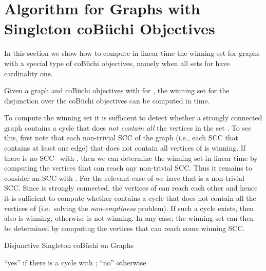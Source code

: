 \documentclass[11pt,letterpaper]{article}
\begin{document}
\section{Algorithm for Graphs with Singleton coBüchi Objectives}\label{sec:singleton}
In this section we show how to compute  in linear time the winning set
for graphs with a special type of coBüchi objectives, namely when all sets 
for  have cardinality one. 
\begin{theorem}
	Given a graph  and coBüchi objectives  with 
	 for , the winning set for the 
	disjunction over the coBüchi objectives can be computed in  time.
\end{theorem}
To compute the winning set it is sufficient to detect whether a strongly connected
graph contains a cycle that does \emph{not contain all} the vertices 
in the set .
To see this, first note that each non-trivial SCC of the graph (i.e., each 
SCC that contains at least one edge) that does not contain all vertices of 
is winning. If there is no SCC~ with , then
we can determine the winning set in linear time by computing
the vertices that can reach any non-trivial SCC. Thus it remains to consider
an SCC  with . For the relevant case of  we have that  is a non-trivial SCC.
Since  is strongly connected, 
the vertices of  can reach each other and hence it is sufficient to compute whether
 contains a cycle that does not contain all the vertices of  (i.e.\ 
solving the \emph{non-emptiness} problem).
If such a cycle exists, then also  is winning, otherwise  is not winning.
In any case, the winning set can then be determined by computing the vertices
that can reach some winning SCC.

\begin{algorithm}
	\caption{Disjunctive Singleton coBüchi on Graphs}
	\label{alg:SingletonCoBuchiGraph}
	\BlankLine
	\Output
	{
	 ``yes'' if there is a cycle  with ; ``no'' otherwise
	}
	\BlankLine
	\;
\end{algorithm}
\end{document}
